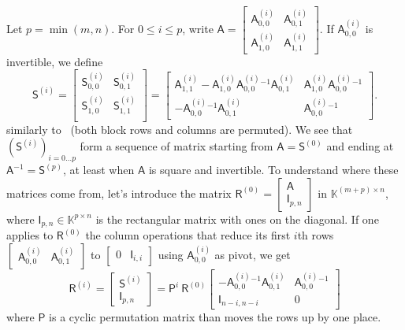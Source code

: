\documentclass{sig-alternate}
\newcommand{\mA}{\ensuremath{\mathsf{A}}}
\newcommand{\mI}{\ensuremath{\mathsf{I}}}
\newcommand{\mP}{\ensuremath{\mathsf{P}}}
\newcommand{\mR}{\ensuremath{\mathsf{R}}}
\newcommand{\mS}{\ensuremath{\mathsf{S}}}
\newcommand{\K}{\ensuremath{\mathbb{K}}}
\begin{document}
Let $p=\min(m,n)$. For $0\leq i \leq p$, write
$
\mA=\begin{bmatrix}
    \mA^{(i)}_{0,0} & \mA^{(i)}_{0,1} \\[1mm]
    \mA^{(i)}_{1,0} & \mA^{(i)}_{1,1}
  \end{bmatrix}\!\!.
$
If ${\mA^{(i)}_{0,0}}$ is invertible, we define
$$
\mS^{(i)} = 
\begin{bmatrix} 
     \mS^{(i)}_{0,0} & \mS^{(i)}_{0,1}\\
     \mS^{(i)}_{1,0} & \mS^{(i)}_{1,1}\\
\end{bmatrix} = 
\begin{bmatrix} 
  \mA^{(i)}_{1,1} - \mA^{(i)}_{1,0} {\mA^{(i)}_{0,0}}{}^{-1} \mA^{(i)}_{0,1} 
  & 
  \mA^{(i)}_{1,0} {\mA^{(i)}_{0,0}}{}^{-1} 
  \\[1mm]
  -{\mA^{(i)}_{0,0}}{}^{-1} \mA^{(i)}_{0,1}
  &  
  {\mA^{(i)}_{0,0}}{}^{-1} 
\end{bmatrix}.
$$
similarly to~\cite{Cardinal99} (both block rows and columns are
permuted).  We see that $( \mS^{(i)})_{i=0\dots p}$ form a sequence of
matrix starting from $\mA=\mS^{(0)}$ and ending at
$\mA^{-1}=\mS^{(p)}$, at least when $\mA$ is square and invertible. To
understand where these matrices come from, let's introduce the matrix
$ \mR^{(0)} = \begin{bmatrix}
  \mA \\
  \mI_{p, n}
\end{bmatrix} 
$
in $\K^{(m + p) \times n} $, where $\mI_{p, n} \in \K^{p \times n}$ is
the rectangular matrix with ones on the diagonal. If one applies to
$\mR^{(0)}$ the column operations that reduce its first $i$th rows
$\begin{bmatrix} \mA^{(i)}_{0,0} & \mA^{(i)}_{0,1} \end{bmatrix}$ to
$\begin{bmatrix} 0 & \mI_{i,i} \end{bmatrix}$ using $\mA^{(i)}_{0,0}$
as pivot, we get
\begin{equation}\label{eq:Ri}
\mR^{(i)} =
\begin{bmatrix}
  \mS^{(i)} \\
  \mI_{p, n}
\end{bmatrix} 
= \mP^i \ \mR^{(0)} 
\begin{bmatrix}
  - \mA_{0, 0}^{(i)} \phantom{}^{- 1} \mA_{0, 1}^{(i)}
  & 
  \mA_{0, 0}^{(i)} \phantom{}^{- 1} \\
 \mI_{n - i,n-i} & 0
\end{bmatrix}
\end{equation}
where $\mP$ is a cyclic permutation matrix than moves the rows up by one place.
\end{document}
